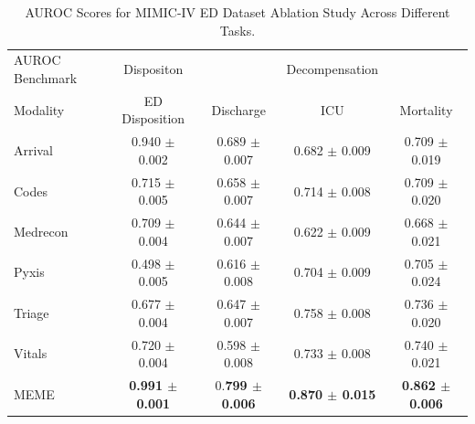 \documentclass{article}
\theoremstyle{plain}
\theoremstyle{definition}
\theoremstyle{remark}
\begin{document}
\begin{table}[H]
\caption{AUROC Scores for MIMIC-IV ED Dataset Ablation Study Across Different Tasks.
}
\centering
\label{r5}
\begin{adjustbox}{width=5in}
\begin{small}
\begin{tabular}{l|c|ccc}
\toprule
AUROC Benchmark & Dispositon & & Decompensation &\\
Modality & ED Disposition & Discharge & ICU & Mortality \\
\midrule
Arrival & 0.940 $\pm$ 0.002 & 0.689 $\pm$ 0.007 & 0.682 $\pm$ 0.009 & 0.709 $\pm$ 0.019 \\
Codes & 0.715 $\pm$ 0.005 & 0.658 $\pm$ 0.007 & 0.714 $\pm$ 0.008 & 0.709 $\pm$ 0.020 \\
Medrecon & 0.709 $\pm$ 0.004 & 0.644 $\pm$ 0.007 & 0.622 $\pm$ 0.009 & 0.668 $\pm$ 0.021 \\
Pyxis & 0.498 $\pm$ 0.005 & 0.616 $\pm$ 0.008 & 0.704 $\pm$ 0.009 & 0.705 $\pm$ 0.024 \\
Triage & 0.677 $\pm$ 0.004 & 0.647 $\pm$ 0.007 & 0.758 $\pm$ 0.008 & 0.736 $\pm$ 0.020 \\
Vitals & 0.720 $\pm$ 0.004 & 0.598 $\pm$ 0.008 & 0.733 $\pm$ 0.008 & 0.740 $\pm$ 0.021 \\
MEME & \textbf{0.991 $\pm$ 0.001} & 0.\textbf{799 $\pm$ 0.006} & \textbf{0.870 $\pm$ 0.015} & \textbf{0.862 $\pm$ 0.006} \\
\bottomrule
\end{tabular}
\end{small}
\end{adjustbox}
\end{table}
\end{document}

